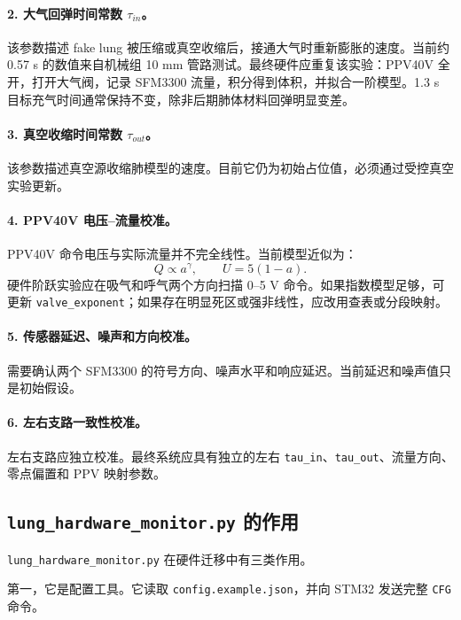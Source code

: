 \documentclass[UTF8,11pt,a4paper]{ctexart}
\begin{document}
\paragraph{2. 大气回弹时间常数 \texorpdfstring{$\tau_{in}$}{tau\_in}。}
该参数描述 fake lung 被压缩或真空收缩后，接通大气时重新膨胀的速度。当前约 0.57 s 的数值来自机械组 10 mm 管路测试。最终硬件应重复该实验：PPV40V 全开，打开大气阀，记录 SFM3300 流量，积分得到体积，并拟合一阶模型。1.3 s 目标充气时间通常保持不变，除非后期肺体材料回弹明显变差。

\paragraph{3. 真空收缩时间常数 \texorpdfstring{$\tau_{out}$}{tau\_out}。}
该参数描述真空源收缩肺模型的速度。目前它仍为初始占位值，必须通过受控真空实验更新。

\paragraph{4. PPV40V 电压--流量校准。}
PPV40V 命令电压与实际流量并不完全线性。当前模型近似为：
\begin{equation}
  Q \propto a^\gamma,
  \qquad
  U=5(1-a).
\end{equation}
硬件阶跃实验应在吸气和呼气两个方向扫描 0--5 V 命令。如果指数模型足够，可更新 \texttt{valve\_exponent}；如果存在明显死区或强非线性，应改用查表或分段映射。

\paragraph{5. 传感器延迟、噪声和方向校准。}
需要确认两个 SFM3300 的符号方向、噪声水平和响应延迟。当前延迟和噪声值只是初始假设。

\paragraph{6. 左右支路一致性校准。}
左右支路应独立校准。最终系统应具有独立的左右 \texttt{tau\_in}、\texttt{tau\_out}、流量方向、零点偏置和 PPV 映射参数。

\subsection{\texttt{lung\_hardware\_monitor.py} 的作用}

\texttt{lung\_hardware\_monitor.py} 在硬件迁移中有三类作用。

第一，它是配置工具。它读取 \texttt{config.example.json}，并向 STM32 发送完整 \texttt{CFG} 命令。
\end{document}
